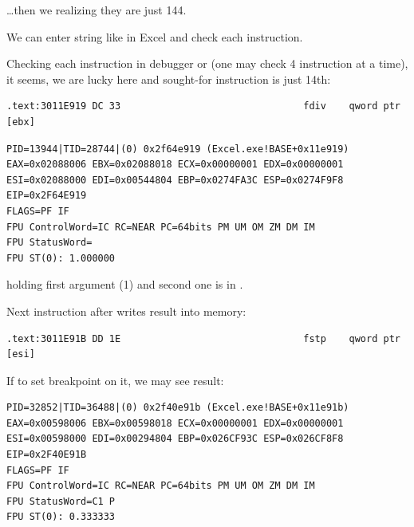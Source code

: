 {\dots then we realizing they are just 144.}

{We can enter string like  in Excel and check each instruction.}

{Checking each instruction in debugger or \tracer
(one may check 4 instruction at a time),
it seems, we are lucky here and sought-for instruction is just 14th:}

\begin{lstlisting}
.text:3011E919 DC 33                                fdiv    qword ptr [ebx]
\end{lstlisting}

\begin{lstlisting}
PID=13944|TID=28744|(0) 0x2f64e919 (Excel.exe!BASE+0x11e919)
EAX=0x02088006 EBX=0x02088018 ECX=0x00000001 EDX=0x00000001
ESI=0x02088000 EDI=0x00544804 EBP=0x0274FA3C ESP=0x0274F9F8
EIP=0x2F64E919
FLAGS=PF IF
FPU ControlWord=IC RC=NEAR PC=64bits PM UM OM ZM DM IM 
FPU StatusWord=
FPU ST(0): 1.000000
\end{lstlisting}

{\STZERO holding first argument (1) and second one is in} \TT{[ebx]}.

{Next instruction after \FDIV writes result into memory:}

\begin{lstlisting}
.text:3011E91B DD 1E                                fstp    qword ptr [esi]
\end{lstlisting}

{If to set breakpoint on it, we may see result:}

\begin{lstlisting}
PID=32852|TID=36488|(0) 0x2f40e91b (Excel.exe!BASE+0x11e91b)
EAX=0x00598006 EBX=0x00598018 ECX=0x00000001 EDX=0x00000001
ESI=0x00598000 EDI=0x00294804 EBP=0x026CF93C ESP=0x026CF8F8
EIP=0x2F40E91B
FLAGS=PF IF
FPU ControlWord=IC RC=NEAR PC=64bits PM UM OM ZM DM IM 
FPU StatusWord=C1 P 
FPU ST(0): 0.333333
\end{lstlisting}

